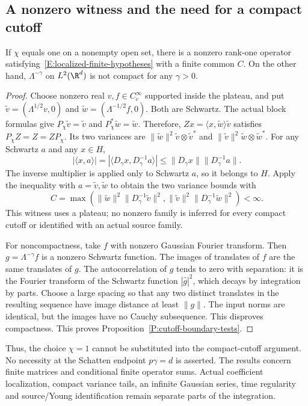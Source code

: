 \subsection{A nonzero witness and the need for a compact cutoff}

\begin{proposition}\label{P:cutoff-boundary-tests}
  If $\chi$ equals one on a nonempty open set, there is a nonzero rank-one
  operator satisfying~\eqref{E:localized-finite-hypotheses} with a finite
  common $C$. On the other hand, $\Lambda^{-\gamma}$ on $L^2(\R^d)$ is
  not compact for any $\gamma > 0$.
\end{proposition}

\begin{proof}
  Choose nonzero real $v,f \in C_c^\infty$ supported inside the plateau,
  and put $\widetilde v=(\Lambda^{1/2}v,0)$ and
  $\widetilde w=(\Lambda^{-1/2}f,0)$. Both are Schwartz. The actual block
  formulas give $P_\chi\widetilde v=\widetilde v$ and
  $P_\chi^*\widetilde w=\widetilde w$. Therefore,
  $Zx=\langle x,\widetilde w\rangle\widetilde v$ satisfies
  $P_\chi Z=Z=ZP_\chi$. Its two variances are
  $\|\widetilde w\|^2\widetilde v\otimes\widetilde v^*$ and
  $\|\widetilde v\|^2\widetilde w\otimes\widetilde w^*$. For any Schwartz
  $a$ and any $x \in H$,
  \[
    |\langle x,a\rangle|
    =|\langle D_\gamma x,D_\gamma^{-1}a\rangle|
    \le\|D_\gamma x\|\|D_\gamma^{-1}a\|.
  \]
  The inverse multiplier is applied only to Schwartz $a$, so it belongs
  to $H$. Apply the inequality with $a=\widetilde v,\widetilde w$ to obtain
  the two variance bounds with
  \[
    C=\max\left(
    \|\widetilde w\|^2\|D_\gamma^{-1}\widetilde v\|^2,
    \|\widetilde v\|^2\|D_\gamma^{-1}\widetilde w\|^2\right)<\infty.
  \]
  This witness uses a plateau; no nonzero family is inferred for every
  compact cutoff or identified with an actual source family.

  For noncompactness, take $f$ with nonzero Gaussian Fourier transform.
  Then $g=\Lambda^{-\gamma}f$ is a nonzero Schwartz function. The images
  of translates of $f$ are the same translates of $g$. The autocorrelation
  of $g$ tends to zero with separation: it is the Fourier transform of
  the Schwartz function $|\widehat g|^2$, which decays by integration by
  parts. Choose a large spacing so that any two distinct translates in
  the resulting sequence have image distance at least $\|g\|$. The input
  norms are identical, but the images have no Cauchy subsequence. This
  disproves compactness.
  This proves Proposition~\ref{P:cutoff-boundary-tests}.
\end{proof}

Thus, the choice $\chi=1$ cannot be substituted into the compact-cutoff
argument. No necessity at the Schatten endpoint $p\gamma=d$ is asserted.
The results concern finite matrices and conditional finite operator sums.
Actual coefficient localization, compact variance tails, an infinite
Gaussian series, time regularity and source/Young identification remain
separate parts of the integration.
